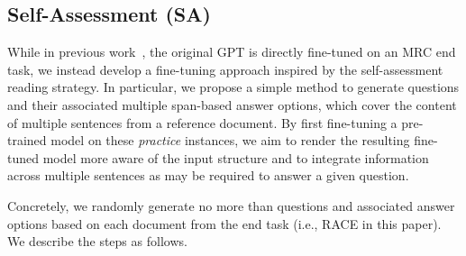 \documentclass[11pt,a4paper]{article}
\newcommand{\ie}{{i.e.}}
\begin{document}
\subsection{Self-Assessment (SA)}
\label{sec:sa}
While in previous work~\cite{radfordimproving}, the original GPT is directly fine-tuned on
an MRC end task, we instead develop a fine-tuning approach inspired by the self-assessment reading strategy.
In particular, we propose a simple method to generate questions and their associated multiple span-based answer options, which cover the content of multiple sentences from a reference document. By first fine-tuning a pre-trained model on these \emph{practice} instances, we aim to render the resulting fine-tuned model more 
aware of the input structure and to integrate information across multiple sentences as may be required to answer a given question. 

Concretely, we randomly generate no more than  questions and associated answer options based on each document from the end task (\ie, RACE in this paper). We describe the steps as follows.
\end{document}
